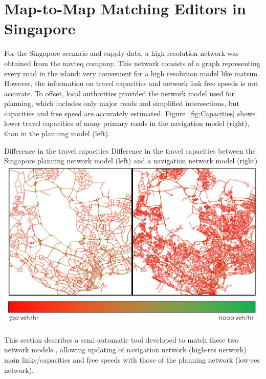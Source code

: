 \section{Map-to-Map Matching Editors in Singapore}
\label{sec:networkeditor-singapore}
For the Singapore scenario and supply data, a high resolution network was obtained from the \gls{navteq} company. This network consists of a graph representing every road in the island: very convenient for a high resolution model like \gls{matsim}. However, the information on travel capacities and network link free speeds is not accurate. To offset, local authorities provided the network model used for planning, which includes only major roads and simplified intersections, but capacities and free speed are accurately estimated. Figure~\ref{fig:Capacities} shows lower travel capacities of many primary roads in the navigation model (right), than in the planning model (left).

\createfigure
{Difference in the travel capacities}
{Difference in the travel capacities between the Singapore planning network model (left) and a navigation network model (right)}
{\label{fig:Capacities}}
{\includegraphics[width=1.0\textwidth]{extending/figures/netEdSing/Capacities.png}}
{}

This section describes a semi-automatic tool developed to match these two network models \citep[][]{Ordonez_Webpage_2011_3}, allowing updating of navigation network (high-res network) main links/capacities and free speeds with those of the planning network (low-res network).

